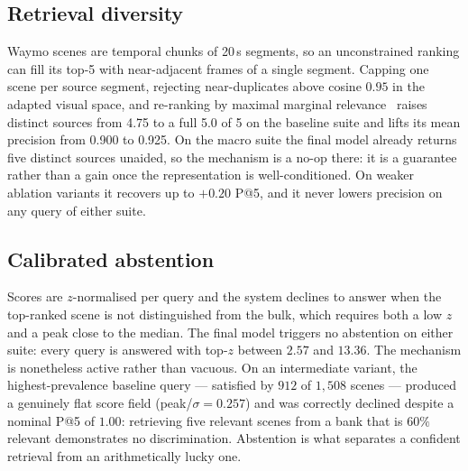 \documentclass[10pt,twocolumn,letterpaper]{article}
\begin{document}
\subsection{Retrieval diversity}
Waymo scenes are temporal chunks of 20\,s segments, so an unconstrained
ranking can fill its top-5 with near-adjacent frames of a single segment.
Capping one scene per source segment, rejecting near-duplicates above
cosine $0.95$ in the adapted visual space, and re-ranking by maximal
marginal relevance~\cite{mmr} raises distinct sources from 4.75 to a full 5.0 of 5 on
the baseline suite and lifts its mean precision from 0.900 to 0.925. On the
macro suite the final model already returns five distinct sources
unaided, so the mechanism is a no-op there: it is a guarantee rather than a
gain once the representation is well-conditioned. On weaker ablation
variants it recovers up to $+0.20$ P@5, and it never lowers precision on
any query of either suite.

\subsection{Calibrated abstention}
Scores are $z$-normalised per query and the system declines to answer when
the top-ranked scene is not distinguished from the bulk, which requires
both a low $z$ and a peak close to the median. The final model triggers no
abstention on either suite: every query is answered with top-$z$ between
$2.57$ and $13.36$. The mechanism is nonetheless active rather than vacuous.
On an intermediate variant, the highest-prevalence baseline query ---
satisfied by $912$ of $1{,}508$ scenes --- produced a genuinely flat score
field (peak/$\sigma = 0.257$) and was correctly declined despite a nominal
P@5 of $1.00$: retrieving five relevant scenes from a bank that is $60\%$
relevant demonstrates no discrimination. Abstention is what separates a
confident retrieval from an arithmetically lucky one.
\end{document}
